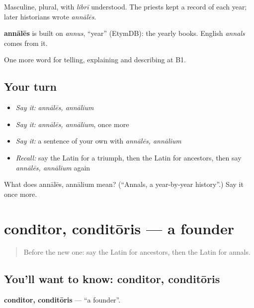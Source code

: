 Masculine, plural, with \emph{librī} understood. The priests kept a record of each year; later historians wrote \emph{annālēs}.

\begin{cousinweb}
\textbf{annālēs} is built on \emph{annus}, \textquotedblleft{}year\textquotedblright{} (EtymDB): the yearly books. English \emph{annals} comes from it.
\end{cousinweb}

\begin{grammarlens}[title={What you've built}]
One more word for telling, explaining and describing at B1.
\end{grammarlens}

\subsection*{Your turn}
\begin{itemize}
\raggedright
  \item \emph{Say it:} \emph{annālēs, annālium}
  \item \emph{Say it:} \emph{annālēs, annālium}, once more
  \item \emph{Say it:} a sentence of your own with \emph{annālēs, annālium}
  \item \emph{Recall:} say the Latin for a triumph, then the Latin for ancestors, then say \emph{annālēs, annālium} again
\end{itemize}

\begin{tcolorbox}[breakable,colback=teal!4,colframe=teal!35!black,title={Before you move on}]
What does annālēs, annālium mean? (\textquotedblleft{}Annals, a year-by-year history\textquotedblright{}.) Say it once more.
\end{tcolorbox}
\section[conditor, conditōris]{conditor, conditōris — a founder}

\label{lesson:LA-C344-conditor}



\begin{quote}
Before the new one: say the Latin for ancestors, then the Latin for annals.
\end{quote}

\subsection*{You'll want to know: conditor, conditōris}
\textbf{conditor, conditōris} — \textquotedblleft{}a founder\textquotedblright{}.

